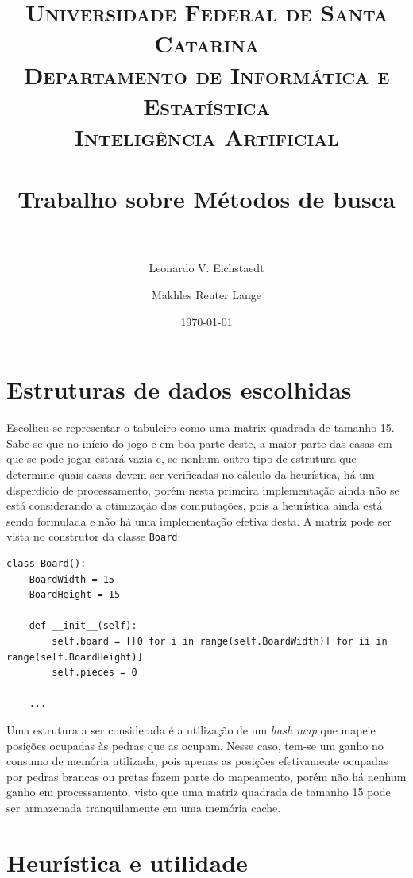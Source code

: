 \documentclass[10pt,a4paper]{article}
\title{
	\usefont{OT1}{bch}{b}{n}
	\normalfont \Large \textsc{Universidade Federal de Santa Catarina\\
		Departamento de Informática e Estatística\\
		Inteligência Artificial
	} \\ [25pt]
	\horrule{0.5pt} \\[0.4cm]
	\huge Trabalho sobre Métodos de busca \\
	\horrule{2pt} \\[0.5cm]
}
\author{Leonardo V. Eichstaedt\\
        \and
        Makhles Reuter Lange
}
\date{\today}
\begin{document}
\maketitle


\section{Estruturas de dados escolhidas}

Escolheu-se representar o tabuleiro como uma matrix quadrada de tamanho 15. Sabe-se que no início do jogo e em boa parte deste, a maior parte das casas em que se pode jogar estará vazia e, se nenhum outro tipo de estrutura que determine quais casas devem ser verificadas no cálculo da heurística, há um disperdício de processamento, porém nesta primeira implementação ainda não se está considerando a otimização das computações, pois a heurística ainda está sendo formulada e não há uma implementação efetiva desta. A matriz pode ser vista no construtor da classe \texttt{Board}:
%
\begin{verbatim}
class Board():
    BoardWidth = 15
    BoardHeight = 15

    def __init__(self):
        self.board = [[0 for i in range(self.BoardWidth)] for ii in range(self.BoardHeight)]
        self.pieces = 0

    ...
\end{verbatim}

Uma estrutura a ser considerada é a utilização de um \emph{hash map} que mapeie posições ocupadas às pedras que as ocupam. Nesse caso, tem-se um ganho no consumo de memória utilizada, pois apenas as posições efetivamente ocupadas por pedras brancas ou pretas fazem parte do mapeamento, porém não há nenhum ganho em processamento, visto que uma matriz quadrada de tamanho 15 pode ser armazenada tranquilamente em uma memória cache.





\section{Heurística e utilidade} \label{sec:heuristica}
\end{document}
